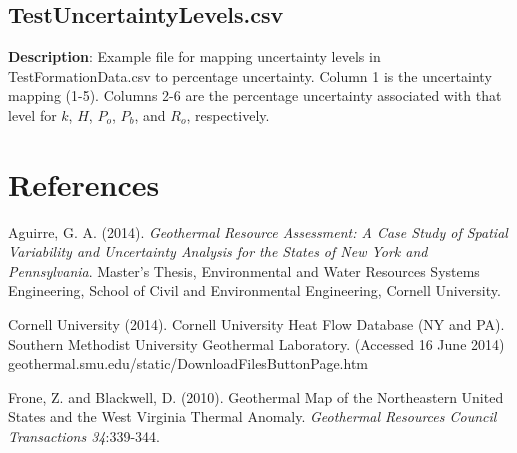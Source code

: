 \documentclass[12pt,a4paper]{article}
\begin{document}
\subsection{\textsf{TestUncertaintyLevels.csv}}

\textbf{Description}: Example file for mapping uncertainty levels in \textsf{TestFormationData.csv} to percentage uncertainty. Column 1 is the uncertainty mapping (1-5). Columns 2-6 are the percentage uncertainty associated with that level for $k$, $H$, $P_o$, $P_b$, and $R_o$, respectively.

\section*{References}

Aguirre, G. A. (2014). \textit{Geothermal Resource Assessment: A Case Study of Spatial Variability and Uncertainty Analysis for the States of New York and Pennsylvania}. Master's Thesis, Environmental and Water Resources Systems Engineering, School of Civil and Environmental Engineering, Cornell University.\hfill
\bigskip

\noindent
Cornell University (2014). Cornell University Heat Flow Database (NY and PA). Southern Methodist University Geothermal Laboratory. (Accessed 16 June 2014) geothermal.smu.edu/static/DownloadFilesButtonPage.htm \hfill
\bigskip

\noindent
Frone, Z. and Blackwell, D. (2010). Geothermal Map of the Northeastern United States and the West Virginia Thermal Anomaly. \textit{Geothermal Resources Council Transactions 34}:339-344.
\end{document}
